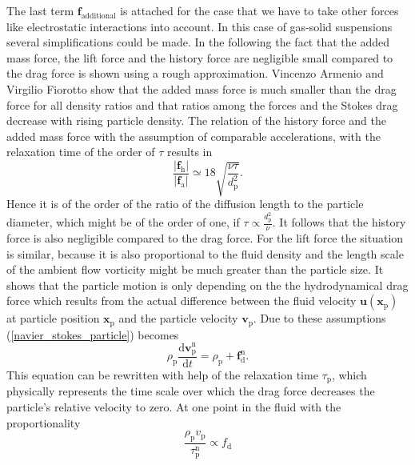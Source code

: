 \documentclass[11pt,a4paper,openany,oneside,parskip=half*]{article}
\renewcommand*\vec[1]{\boldsymbol{#1}}
\begin{document}
The last term $\vec{f}_\mathrm{additional}$ is attached for the case that we have to take other forces like electrostatic interactions into account.
In this case of gas-solid suspensions several simplifications could be made.
\newline
In the following the fact that the added mass force, the lift force and the history force are negligible small compared to the drag force is shown using a rough approximation.
Vincenzo Armenio and Virgilio Fiorotto \cite{TheImportanceOfTheFocusActingOnParticlesInTurbulentFlows} show that the added mass force is much smaller than the drag force for all density ratios and that ratios among the forces and the Stokes drag decrease with rising particle density.
The relation of the history force and the added mass force with the assumption of comparable accelerations, with the relaxation time of the order of $\tau$ results in
\begin{equation}
\frac{|\vec{f}_\mathrm{h}|}{|\vec{f}_\mathrm{a}|}\simeq 18 \sqrt{\frac{\nu\tau}{d_\mathrm{p}^\mathrm{2}}}.
\end{equation}
Hence it is of the order of the ratio of the diffusion length to the particle diameter, which might be of the order of one, if $\tau \propto \frac{d_\mathrm{p}^\mathrm{2}}{\nu}$.
It follows that the history force is also negligible compared to the drag force.
For the lift force the situation is similar, because it is also proportional to the fluid density and the length scale of the ambient flow vorticity might be much greater than the particle size.
It shows that the particle motion is only depending on the the hydrodynamical drag force which results from the actual difference between the fluid velocity $\vec{u}(\vec{x}_\mathrm{p})$ at particle position $\vec{x}_\mathrm{p}$ and the particle velocity $\vec{v}_\mathrm{p}$.
Due to these assumptions (\ref{navier_stokes_particle}) becomes
\begin{equation}
\rho_\mathrm{p}\frac{\mathrm{d}\vec{v}_\mathrm{p}^\mathrm{n}}{\mathrm{d}t} = \rho_\mathrm{p}+\vec{f}_\mathrm{d}^\mathrm{n}.
\end{equation}
This equation can be rewritten with help of the relaxation time $\tau_\mathrm{p}$, which physically represents the time scale over which the drag force decreases the particle's relative velocity to zero. At one point in the fluid with the proportionality 
\begin{equation}
\frac{\rho_\mathrm{p} v_\mathrm{p}}{\tau_\mathrm{p}^\mathrm{n}} \propto f_\mathrm{d}
\end{equation} 
\end{document}
